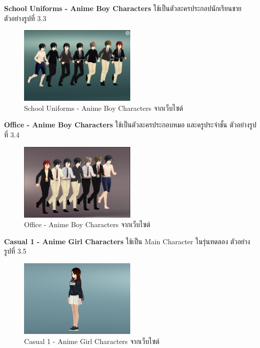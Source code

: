 \subsubitem \textbf{School Uniforms - Anime Boy Characters} \cite{School-Uniforms-Anime-Boy-Characters:asset} ใช้เป็นตัวละครประกอปนักเรียนชาย ตัวอย่างรูปที่ 3.3
\begin{figure}[h]
  \centering
  \includegraphics[width=0.5\textwidth, height=0.15\textheight]{Images/School Uniforms - Anime Boy Characters.png}
  \caption{School Uniforms - Anime Boy Characters จากเว็บไซต์} \label{School Uniforms - Anime Boy Characters}
\end{figure} 


\subsubitem \textbf{Office - Anime Boy Characters} \cite{Office-Anime-Boy-Characters:asset} ใช้เป็นตัวละครประกอบหมอ และครูประจำชั้น ตัวอย่างรูปที่ 3.4
\begin{figure}
  \centering
  \includegraphics[width=0.5\textwidth, height=0.15\textheight]{Images/Office - Anime Boy Characters.png}
  \caption{Office - Anime Boy Characters จากเว็บไซต์} \label{Office - Anime Boy Characters}
\end{figure}


\subsubitem \textbf{Casual 1 - Anime Girl Characters} \cite{anime-girl:asset} ใช้เป็น Main Character ในรุ่นทดลอง ตัวอย่างรูปที่ 3.5
\begin{figure}[h]
  \centering
  \includegraphics[width=0.5\textwidth, height=0.15\textheight]{Images/7c8d1857-1f28-440d-a966-2c09fe1db214_orig.png}
  \caption{Casual 1 - Anime Girl Characters จากเว็บไซต์}\label{AnimeGirl}
\end{figure}

